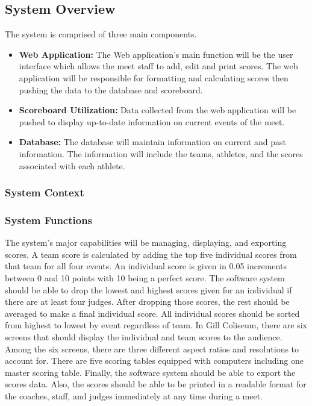 \documentclass[letterpaper,10pt,draftclsnofoot,onecolumn,]{article}
\begin{document}
\subsection{System Overview}
The system is comprised of three main components.
\begin{itemize}
    \item \textbf{Web Application:}
          The Web application's main function will be the user interface which allows the meet staff to add, edit and print scores. The web application will be responsible for formatting and calculating scores then pushing the data to the database and scoreboard.
    \item \textbf{Scoreboard Utilization:}
          Data collected from the web application will be pushed to display up-to-date information on current events of the meet.
    \item \textbf{Database:}
          The database will maintain information on current and past information. The information will include the teams, athletes, and the scores associated with each athlete.
\end{itemize}
\subsubsection{System Context}

\newline
\subsubsection{System Functions}
The system's major capabilities will be managing, displaying, and exporting scores. A team score is calculated by adding the top five individual scores from that team for all four events. An individual score is given in 0.05 increments between 0 and 10 points with 10 being a perfect score. The software system should be able to drop the lowest and highest scores given for an individual if there are at least four judges. After dropping those scores, the rest should be averaged to make a final individual score. All individual scores should be sorted from highest to lowest by event regardless of team. In Gill Coliseum, there are six screens that should display the individual and team scores to the audience. Among the six screens, there are three different aspect ratios and resolutions to account for. There are five scoring tables equipped with computers including one master scoring table. Finally, the software system should be able to export the scores data. Also, the scores should be able to be printed in a readable format for the coaches, staff, and judges immediately at any time during a meet.
\end{document}

